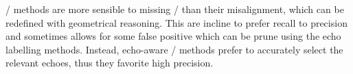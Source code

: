 \begin{description}
    \RooGE/ methods are more sensible to missing \TOAs/ than their misalignment, which can be redefined with geometrical reasoning.
    This are incline to prefer recall to precision and sometimes allows for some false positive which can be prune using the echo labelling methods.
    Instead, echo-aware \SE/ methods prefer to accurately select the relevant echoes, thus they favorite high precision.
\end{description}

